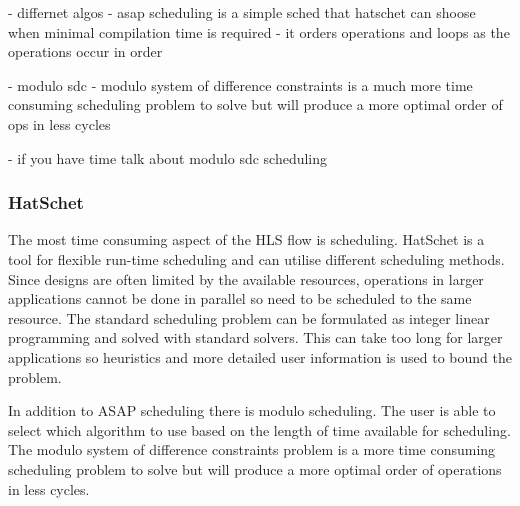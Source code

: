 - differnet algos - asap scheduling is a simple sched that hatschet can shoose when minimal compilation time is required 
- it orders operations and loops as the operations occur in order

- modulo sdc - modulo system of difference constraints is a much more time consuming scheduling problem to solve but will produce a more optimal order of ops in less cycles

- if you have time talk about modulo sdc scheduling

\subsubsection{HatSchet}
The most time consuming aspect of the HLS flow is scheduling. HatSchet \cite{hatschet} is a tool for flexible run-time scheduling and can utilise different scheduling methods. Since designs are often limited by the available resources, operations in larger applications cannot be done in parallel so need to be scheduled to the same resource. The standard scheduling problem can be formulated as integer linear programming and solved with standard solvers. This can take too long for larger applications so heuristics and more detailed user information is used to bound the problem. 

In addition to ASAP scheduling there is modulo scheduling. The user is able to select which algorithm to use based on the length of time available for scheduling. The modulo system of difference constraints problem is a more time consuming scheduling problem to solve but will produce a more optimal order of operations in less cycles.
\fi